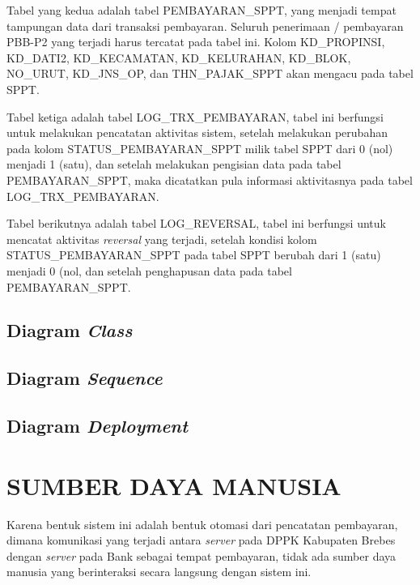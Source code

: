 \documentclass[pdftex,12pt, oneside]{article}
\begin{document}
Tabel yang kedua adalah tabel PEMBAYARAN\_SPPT, yang menjadi tempat tampungan data dari transaksi pembayaran. Seluruh penerimaan / pembayaran PBB-P2 yang terjadi harus tercatat pada tabel ini. Kolom KD\_PROPINSI, KD\_DATI2, KD\_KECAMATAN, KD\_KELURAHAN, KD\_BLOK, NO\_URUT, KD\_JNS\_OP, dan THN\_PAJAK\_SPPT akan mengacu pada tabel SPPT.

Tabel ketiga adalah tabel LOG\_TRX\_PEMBAYARAN, tabel ini berfungsi untuk melakukan pencatatan aktivitas sistem, setelah melakukan perubahan pada kolom STATUS\_PEMBAYARAN\_SPPT milik tabel SPPT dari 0 (nol) menjadi 1 (satu), dan setelah melakukan pengisian data pada tabel PEMBAYARAN\_SPPT, maka dicatatkan pula informasi aktivitasnya pada tabel LOG\_TRX\_PEMBAYARAN.

Tabel berikutnya adalah tabel LOG\_REVERSAL, tabel ini berfungsi untuk mencatat aktivitas \textit{reversal} yang terjadi, setelah kondisi kolom STATUS\_PEMBAYARAN\_SPPT pada tabel SPPT berubah dari 1 (satu) menjadi 0 (nol, dan setelah penghapusan data pada tabel PEMBAYARAN\_SPPT.

\subsection{Diagram \textit{Class}}
\subsection{Diagram \textit{Sequence}}
\subsection{Diagram \textit{Deployment}}

\section{SUMBER DAYA MANUSIA}

Karena bentuk sistem ini adalah bentuk otomasi dari pencatatan pembayaran, dimana komunikasi yang terjadi antara \textit{server} pada DPPK Kabupaten Brebes dengan \textit{server} pada Bank sebagai tempat pembayaran, tidak ada sumber daya manusia yang berinteraksi secara langsung dengan sistem ini.
\end{document}
